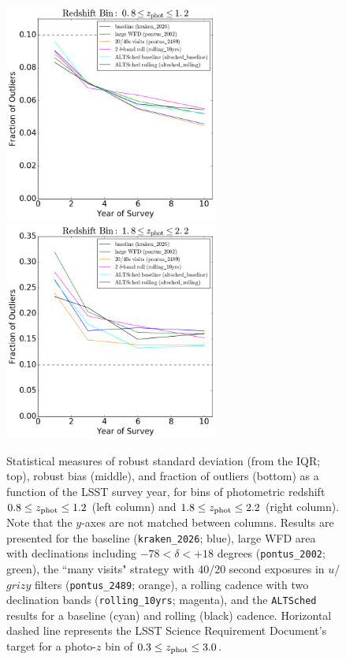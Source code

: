 \begin{figure}
\begin{center}
\includegraphics[width=7cm,trim={0cm 0cm 0cm 0cm},clip]{figures/zbin1_fout.png}
\includegraphics[width=7cm,trim={0cm 0cm 0cm 0cm},clip]{figures/zbin2_fout.png}
\caption{Statistical measures of robust standard deviation (from the IQR; top), robust bias (middle), and fraction of outliers (bottom) as a function of the LSST survey year, for bins of photometric redshift $0.8 \leq z_{\rm phot} \leq 1.2$ (left column) and  $1.8 \leq z_{\rm phot} \leq 2.2$ (right column). Note that the $y$-axes are not matched between columns. Results are presented for the baseline ({\tt kraken\_2026}; blue), large WFD area with declinations including  $-78<\delta<+18$ degrees ({\tt pontus\_2002}; green), the ``many visits" strategy with 40/20 second exposures in $u$/$grizy$ filters ({\tt pontus\_2489}; orange), a rolling cadence with two declination bands ({\tt rolling\_10yrs}; magenta), and the {\tt ALTSched} results for a baseline (cyan) and rolling (black) cadence. Horizontal dashed line represents the LSST Science Requirement Document's target for a photo-$z$ bin of $0.3 \leq z_{\rm phot} \leq 3.0$. \label{fig:evol}}
\end{center}
\end{figure}

